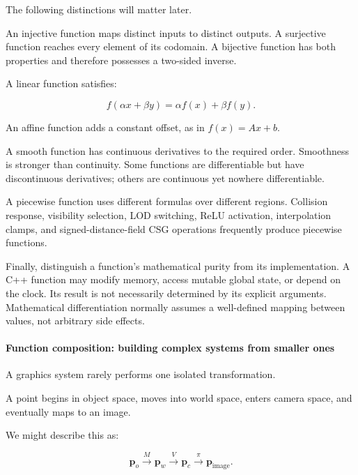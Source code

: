 \hypertarget{01-foundations-i-ch020-functions-have-more-properties-than-their-formulas-suggest}{}

The following distinctions will matter later.

An injective function maps distinct inputs to distinct outputs. A surjective function reaches every element of its codomain. A bijective function has both properties and therefore possesses a two-sided inverse.

A linear function satisfies:

\[
f(\alpha x+\beta y)=\alpha f(x)+\beta f(y).
\]

An affine function adds a constant offset, as in \(f(x)=Ax+b\).

A smooth function has continuous derivatives to the required order. Smoothness is stronger than continuity. Some functions are differentiable but have discontinuous derivatives; others are continuous yet nowhere differentiable.

A piecewise function uses different formulas over different regions. Collision response, visibility selection, LOD switching, ReLU activation, interpolation clamps, and signed-distance-field CSG operations frequently produce piecewise functions.

Finally, distinguish a function's mathematical purity from its implementation. A C++ function may modify memory, access mutable global state, or depend on the clock. Its result is not necessarily determined by its explicit arguments. Mathematical differentiation normally assumes a well-defined mapping between values, not arbitrary side effects.

\paragraph{Function composition: building complex systems from smaller ones}\label{01-foundations-i-ch020-function-composition-building-complex-systems-from-smaller-ones}

\hypertarget{01-foundations-i-ch020-function-composition-building-complex-systems-from-smaller-ones}{}

A graphics system rarely performs one isolated transformation.

A point begins in object space, moves into world space, enters camera space, and eventually maps to an image.

We might describe this as:

\[
\mathbf p_o \xrightarrow{M} \mathbf p_w \xrightarrow{V} \mathbf p_c \xrightarrow{\pi} \mathbf p_{\text{image}}.
\]

